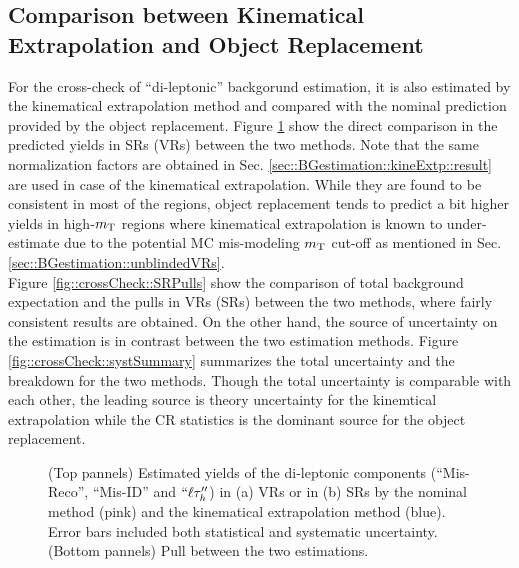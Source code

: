 \subsection{Comparison between Kinematical Extrapolation and Object Replacement}  \label{sec::crossCheckBGestm}
For the cross-check of ``di-leptonic'' backgorund estimation, 
it is also estimated by the kinematical extrapolation method and compared with the nominal prediction  provided by the object replacement.
Figure \ref{fig::crossCheck::pull_KineExtp_ObjRep} show the direct comparison in the predicted yields in SRs (VRs) between the two methods.
Note that the same normalization factors are obtained in Sec. \ref{sec::BGestimation::kineExtp::result} are used in case of the kinematical extrapolation. 
While they are found to be consistent in most of the regions, object replacement tends to predict a bit higher yields in high-$m_{\mathrm{T}}$ regions where kinematical extrapolation is known to under-estimate due to the potential MC mis-modeling $m_{\mathrm{T}}$ cut-off as mentioned in Sec. \ref{sec::BGestimation::unblindedVRs}. \\

Figure \ref{fig::crossCheck::SRPulls} show the comparison of total background expectation and the pulls in VRs (SRs) between the two methods, where fairly consistent results are obtained.
On the other hand, the source of uncertainty on the estimation is in contrast between the two estimation methods.
Figure \ref{fig::crossCheck::systSummary} summarizes the total uncertainty and the breakdown for the two methods. 
Though the total uncertainty is comparable with each other, the leading source is theory uncertainty for the kinemtical extrapolation while the CR statistics is the dominant source for the object replacement.


\clearpage
\begin{figure}[h]
  \centering
    \caption{ 
    (Top pannels) Estimated yields of the di-leptonic components (``Mis-Reco'', ``Mis-ID'' and $``\ell\tau_h''$) in (a) VRs or in (b) SRs by the nominal method (pink) and the kinematical extrapolation method (blue). Error bars included both statistical and systematic uncertainty. 
    (Bottom pannels) Pull between the two estimations.
    }
    \label{fig::crossCheck::pull_KineExtp_ObjRep}
\end{figure}


